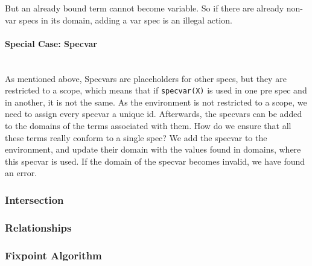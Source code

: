 \documentclass[a4paper]{article}
\begin{document}
But an already bound term cannot become variable. So if there are already
non-var specs in its domain, adding a var spec is an illegal action.

\paragraph{Special Case: Specvar}\hfill\\
As mentioned above, Specvars are placeholders for other specs, but they are
restricted to a scope, which means that if \texttt{specvar(X)} is used in one
pre spec and in another, it is not the same.
As the environment is not restricted to a scope, we need to assign every specvar
a unique id. Afterwards, the specvars can be added to the domains of the terms
associated with them.
How do we ensure that all these terms really conform to a single spec?
We add the specvar to the environment, and update their domain with the values
found in domains, where this specvar is used.
If the domain of the specvar becomes invalid, we have found an error.

\subsubsection{Intersection}
\subsubsection{Relationships}
\subsubsection{Fixpoint Algorithm}
\end{document}

